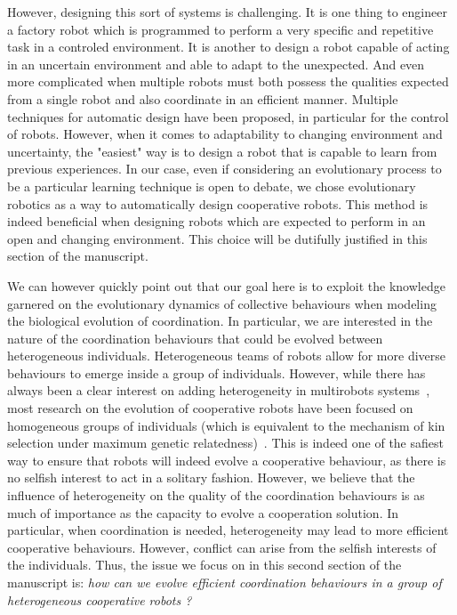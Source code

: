    However, designing this sort of systems is challenging. It is one thing to engineer a factory robot which is programmed to perform a very specific and repetitive task in a controled environment. It is another to design a robot capable of acting in an uncertain environment and able to adapt to the unexpected. And even more complicated when multiple robots must both possess the qualities expected from a single robot and also coordinate in an efficient manner. Multiple techniques for automatic design have been proposed, in particular for the control of robots. However, when it comes to adaptability to changing environment and uncertainty, the "easiest" way is to design a robot that is capable to learn from previous experiences. In our case, even if considering an evolutionary process to be a particular learning technique is open to debate, we chose evolutionary robotics as a way to automatically design cooperative robots. This method is indeed beneficial when designing robots which are expected to perform in an open and changing environment. This choice will be dutifully justified in this section of the manuscript. 

    We can however quickly point out that our goal here is to exploit the knowledge garnered on the evolutionary dynamics of collective behaviours when modeling the biological evolution of coordination. In particular, we are interested in the nature of the coordination behaviours that could be evolved between heterogeneous individuals. Heterogeneous teams of robots allow for more diverse behaviours to emerge inside a group of individuals. However, while there has always been a clear interest on adding heterogeneity in multirobots systems~\parencite{Parker1994, Parker2008}, most research on the evolution of cooperative robots have been focused on homogeneous groups of individuals (which is equivalent to the mechanism of kin selection under maximum genetic relatedness)~\parencite{Waibel2009}. This is indeed one of the safiest way to ensure that robots will indeed evolve a cooperative behaviour, as there is no selfish interest to act in a solitary fashion. However, we believe that the influence of heterogeneity on the quality of the coordination behaviours is as much of importance as the capacity to evolve a cooperation solution. In particular, when coordination is needed, heterogeneity may lead to more efficient cooperative behaviours. However, conflict can arise from the selfish interests of the individuals. Thus, the issue we focus on in this second section of the manuscript is: \emph{how can we evolve efficient coordination behaviours in a group of heterogeneous cooperative robots ?}
